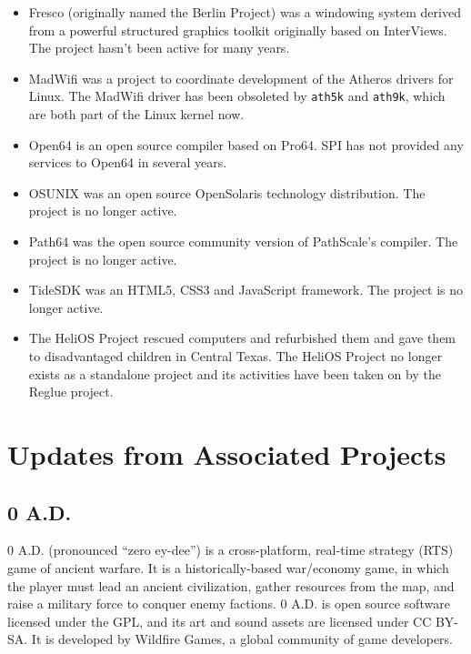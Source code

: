 \documentclass[a4paper]{report}
\begin{document}
\begin{itemize}

\item Fresco (originally named the Berlin Project) was a windowing
system derived from a powerful structured graphics toolkit
originally based on InterViews.  The project hasn't been active
for many years.

\item MadWifi was a project to coordinate development of the Atheros
drivers for Linux.  The MadWifi driver has been obsoleted by
{\tt ath5k} and {\tt ath9k}, which are both part of the Linux kernel
now.

\item Open64 is an open source compiler based on Pro64.  SPI has not
provided any services to Open64 in several years.

\item OSUNIX was an open source OpenSolaris technology distribution.
The project is no longer active.

\item Path64 was the open source community version of PathScale's
compiler.  The project is no longer active.

\item TideSDK was an HTML5, CSS3 and JavaScript framework.  The
project is no longer active.

\item The HeliOS Project rescued computers and refurbished them and
gave them to disadvantaged children in Central Texas.  The HeliOS
Project no longer exists as a standalone project and its activities
have been taken on by the Reglue project.

\end{itemize}

\section{Updates from Associated Projects}

\subsection{0 A.D.}

0 A.D. (pronounced ``zero ey-dee'') is a cross-platform, real-time
strategy (RTS) game of ancient warfare. It is a historically-based
war/economy game, in which the player must lead an ancient civilization,
gather resources from the map, and raise a military force to conquer
enemy factions. 0 A.D. is open source software licensed under the GPL,
and its art and sound assets are licensed under CC BY-SA. It is
developed by Wildfire Games, a global community of game developers.
\end{document}
